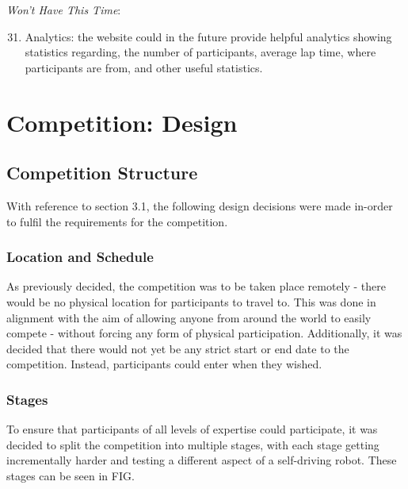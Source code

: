 \documentclass{l4proj}
\begin{document}
\textit{Won't Have This Time}:
\begin{enumerate}[label=\arabic{chapter}.\arabic*]
\setcounter{enumi}{30}
    \item Analytics: the website could in the future provide helpful analytics showing statistics regarding, the number of participants, average lap time, where participants are from, and other useful statistics.
\end{enumerate}

\chapter{Competition: Design}
 
\section{Competition Structure}
With reference to section 3.1, the following design decisions were made in-order to fulfil the requirements for the competition.

\subsection{Location and Schedule}
As previously decided, the competition was to be taken place remotely - there would be no physical location for participants to travel to. This was done in alignment with the aim of allowing anyone from around the world to easily compete - without forcing any form of physical participation. Additionally, it was decided that there would not yet be any strict start or end date to the competition. Instead, participants could enter when they wished.

\subsection{Stages}
To ensure that participants of all levels of expertise could participate, it was decided to split the competition into multiple stages, with each stage getting incrementally harder and testing a different aspect of a self-driving robot. These stages can be seen in FIG.
\end{document}
